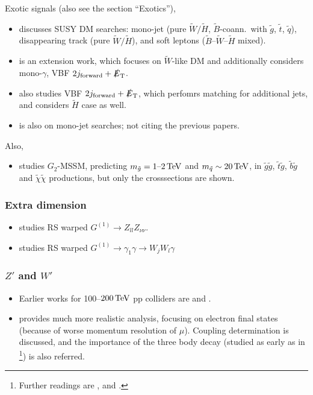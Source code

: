 \documentclass[10pt,a4paper]{article}
\newcommand{\TeV}{\,{\rm TeV}}
\newcommand{\s}[1]{_{\rm #1}}
\newcommand{\MET}{\slashed{E}\s T}
\begin{document}
Exotic signals (also see the section ``Exotics''),
\begin{itemize}
 \item \cite{Low:2014cba} discusses SUSY DM searches: mono-jet (pure $\tilde W/\tilde H$, $\tilde B$-coann.\ with $\tilde g$, $\tilde t$, $\tilde q$), disappearing track (pure $\tilde W/\tilde H$), and soft leptons ($\tilde B$--$\tilde W$--$\tilde H$ mixed).
 \item \cite{Cirelli:2014dsa} is an extension work, which focuses on $\tilde W$-like DM and additionally considers mono-$\gamma$, VBF $2j\s{forward}+\MET$.
 \item \cite{Berlin:2015aba} also studies VBF $2j\s{forward}+\MET$, which perfomrs matching for additional jets, and considers $\tilde H$ case as well.
 \item \cite{Arbey:2015hca} is also on mono-jet searches; not citing the previous papers.
\end{itemize}
Also,
\begin{itemize}
 \item \cite{Ellis:2014kla} studies $G_2$-MSSM, predicting $m_{\tilde g}=1\text{--}2\TeV$ and $m_{\tilde q}\sim20\TeV$, in $\tilde g\tilde g$, $\tilde t\tilde g$, $\tilde b\tilde g$ and $\tilde \chi\tilde \chi$ productions, but only the crosssections are shown.
\end{itemize}




\subsubsection{Extra dimension}
\begin{itemize}
 \item \cite{Chen:2014oha} studies RS warped $G^{(1)}\to Z_{ll}Z_{\nu\nu}$.
 \item \cite{Agashe:2014wba} studies RS warped $G^{(1)}\to\gamma_1\gamma\to W_jW_l\gamma$
\end{itemize}


\subsubsection[Z' and W']{$Z'$ and $W'$}
\begin{itemize}
 \item Earlier works for 100--$200\TeV$ pp colliders are \cite{Rizzo:1996pc} and \cite{Godfrey:2002tna}.
 \item \cite{Rizzo:2014xma} provides much more realistic analysis, focusing on electron final states (because of worse momentum resolution of $\mu$). Coupling determination is discussed, and the importance of the three body decay (studied as early as in \cite{Cvetic:1991gk}\footnote{Further readings are \cite{Ciafaloni:2006qu}, \cite{Baur:2006sn} and \cite{Bell:2010gi}.}) is also referred.
\end{itemize}
\end{document}
